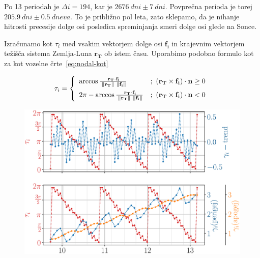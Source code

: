 \documentclass[a4paper,12pt]{article}
\renewcommand{\vec}[1]{\mathbf{#1}} %
\begin{document}
\noindent
Po 13 periodah je $\Delta i = 194$, kar je $\SI{2676}{dni}\pm\SI{7}{dni}$.
Povprečna perioda je torej $\SI{205.9}{dni}\pm\SI{0.5}{dneva}$. To je približno
pol leta, zato sklepamo, da je nihanje hitrosti precesije dolge osi posledica
spreminjanja smeri dolge osi glede na Sonce.

Izračunamo kot $\tau_i$ med vsakim vektorjem dolge osi $\vec{f_i}$ in 
krajevnim vektorjem težišča sistema Zemlja-Luna $\vec{r_T}$ ob istem času. 
Uporabimo podobno formulo kot za kot vozelne črte~\eqref{eq:nodal-kot}

\begin{equation*}
    \tau_i = \left\{
        \begin{array}{ll}
            \arccos{\frac{\: \vec{r_T} \cdot \vec{f_i}}
            {\; \norm{\vec{r_T}} \ \norm{\vec{f_i}}}} & 
            {;\ (\vec{r_T}\times\vec{f_i})\cdot\vec{n} \geq 0} \vspace{0.5em} \\
            2\pi - \arccos{\frac{\: \vec{r_T} \cdot \vec{f_i}}
            {\; \norm{\vec{r_T}} \ \norm{\vec{f_i}}}} & 
            {;\ (\vec{r_T}\times\vec{f_i})\cdot\vec{n} < 0}
        \end{array}
    \right.
\end{equation*}

\newpage

\begin{figure}[h!]
    \centering
    \includegraphics[scale=0.57]{slikep/apsidal-angle-comp.eps}
    \label{fig:apsidal-angle-comp}
\end{figure}
\end{document}
